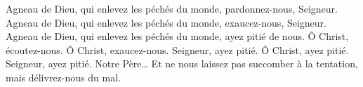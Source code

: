 Agneau de Dieu, qui enlevez les péchés du monde, pardonnez-nous, Seigneur. Agneau de Dieu, qui enlevez les péchés du monde, exaucez-nous, Seigneur. Agneau de Dieu, qui enlevez les péchés du monde, ayez pitié de nous. Ô Christ, écoutez-nous. Ô Christ, exaucez-nous. Seigneur, ayez pitié. Ô Christ, ayez pitié. Seigneur, ayez pitié. Notre Père… Et ne nous laissez pas succomber à la tentation, mais délivrez-nous du mal.

